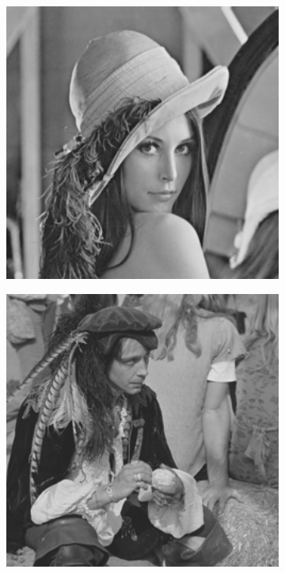 \begin{figure}
\begin{subfigure}[b]{0.09\textwidth}
    \end{subfigure}
    \hfill
    \begin{subfigure}[b]{0.09\textwidth}
        \centering
        \includegraphics[width=1\textwidth]{images/pgpd/lena.png}
    \end{subfigure}
    \hfill
    \begin{subfigure}[b]{0.09\textwidth}
        \centering
        \includegraphics[width=1\textwidth]{images/pgpd/man.png}

\end{subfigure}
\end{figure}

